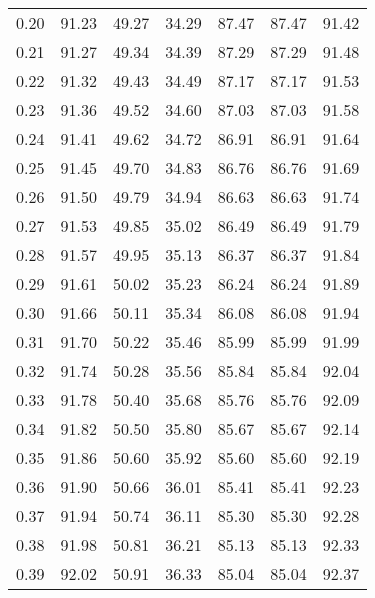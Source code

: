 \begin{tabular}{|c|c|c|c|c|c|c|}
      0.20 &     91.23 &     49.27 &      34.29 &   87.47 &      87.47 &         91.42 \\
      0.21 &     91.27 &     49.34 &      34.39 &   87.29 &      87.29 &         91.48 \\
      0.22 &     91.32 &     49.43 &      34.49 &   87.17 &      87.17 &         91.53 \\
      0.23 &     91.36 &     49.52 &      34.60 &   87.03 &      87.03 &         91.58 \\
      0.24 &     91.41 &     49.62 &      34.72 &   86.91 &      86.91 &         91.64 \\
      0.25 &     91.45 &     49.70 &      34.83 &   86.76 &      86.76 &         91.69 \\
      0.26 &     91.50 &     49.79 &      34.94 &   86.63 &      86.63 &         91.74 \\
      0.27 &     91.53 &     49.85 &      35.02 &   86.49 &      86.49 &         91.79 \\
      0.28 &     91.57 &     49.95 &      35.13 &   86.37 &      86.37 &         91.84 \\
      0.29 &     91.61 &     50.02 &      35.23 &   86.24 &      86.24 &         91.89 \\
      0.30 &     91.66 &     50.11 &      35.34 &   86.08 &      86.08 &         91.94 \\
      0.31 &     91.70 &     50.22 &      35.46 &   85.99 &      85.99 &         91.99 \\
      0.32 &     91.74 &     50.28 &      35.56 &   85.84 &      85.84 &         92.04 \\
      0.33 &     91.78 &     50.40 &      35.68 &   85.76 &      85.76 &         92.09 \\
      0.34 &     91.82 &     50.50 &      35.80 &   85.67 &      85.67 &         92.14 \\
      0.35 &     91.86 &     50.60 &      35.92 &   85.60 &      85.60 &         92.19 \\
      0.36 &     91.90 &     50.66 &      36.01 &   85.41 &      85.41 &         92.23 \\
      0.37 &     91.94 &     50.74 &      36.11 &   85.30 &      85.30 &         92.28 \\
      0.38 &     91.98 &     50.81 &      36.21 &   85.13 &      85.13 &         92.33 \\
      0.39 &     92.02 &     50.91 &      36.33 &   85.04 &      85.04 &         92.37 \\

\end{tabular}
